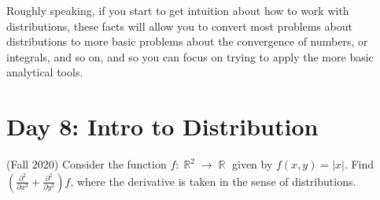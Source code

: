 \documentclass[answers]{exam}
\DeclareMathOperator{\RR}{\mathbb{R}}
\begin{document}
\begin{questions}
Roughly speaking, if you start to get intuition about how to work with distributions, these facts will allow you to convert most problems about distributions to more basic problems about the convergence of numbers, or integrals, and so on, and so you can focus on trying to apply the more basic analytical tools.







\newpage
\section{Day 8: Intro to Distribution}

\item (Fall 2020)
Consider the function $f:\RR^{2}\to \RR$ given by $f(x,y)=|x|$. Find $\left( \frac{\partial ^{2}}{\partial x^{2}}+ \frac{\partial ^{2}}{\partial y^{2}} \right)f$, where the derivative is taken in the sense of distributions.


\end{questions}
\end{document}
